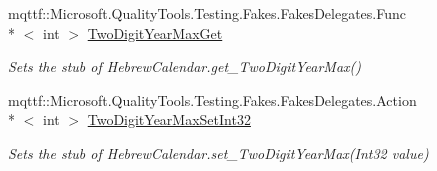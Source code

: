 \begin{DoxyCompactItemize}
mqttf\-::\-Microsoft.\-Quality\-Tools.\-Testing.\-Fakes.\-Fakes\-Delegates.\-Func\\*
$<$ int $>$ \hyperlink{class_system_1_1_globalization_1_1_fakes_1_1_stub_hebrew_calendar_a9245541bff4df043e7a0a83e60d43a63}{Two\-Digit\-Year\-Max\-Get}
\begin{DoxyCompactList}\small\item\em Sets the stub of Hebrew\-Calendar.\-get\-\_\-\-Two\-Digit\-Year\-Max()\end{DoxyCompactList}\item 
mqttf\-::\-Microsoft.\-Quality\-Tools.\-Testing.\-Fakes.\-Fakes\-Delegates.\-Action\\*
$<$ int $>$ \hyperlink{class_system_1_1_globalization_1_1_fakes_1_1_stub_hebrew_calendar_aeb30946e91e95e04cebcb954af286bb3}{Two\-Digit\-Year\-Max\-Set\-Int32}
\begin{DoxyCompactList}\small\item\em Sets the stub of Hebrew\-Calendar.\-set\-\_\-\-Two\-Digit\-Year\-Max(\-Int32 value)\end{DoxyCompactList}\end{DoxyCompactItemize}
